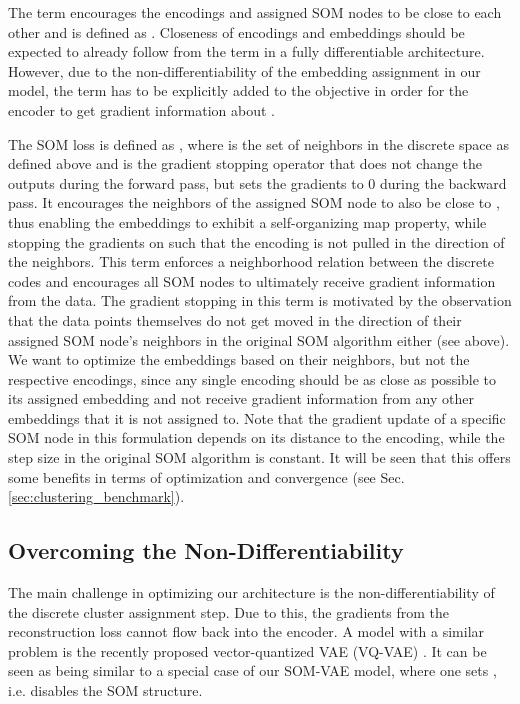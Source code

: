 \documentclass{article}
\begin{document}
The term  encourages the encodings and assigned SOM nodes to be close to each other and is defined as .
Closeness of encodings and embeddings should be expected to already follow from the  term in a fully differentiable architecture.
However, due to the non-differentiability of the embedding assignment in our model, the  term has to be explicitly added to the objective in order for the encoder to get gradient information about .

The SOM loss  is defined as , where  is the set of neighbors in the discrete space as defined above and  is the gradient stopping operator that does not change the outputs during the forward pass, but sets the gradients to 0 during the backward pass.
It encourages the neighbors of the assigned SOM node  to also be close to , thus enabling the embeddings to exhibit a self-organizing map property, while stopping the gradients on  such that the encoding is not pulled in the direction of the neighbors.
This term enforces a neighborhood relation between the discrete codes and encourages all SOM nodes to ultimately receive gradient information from the data.
The gradient stopping in this term is motivated by the observation that the data points themselves do not get moved in the direction of their assigned SOM node's neighbors in the original SOM algorithm either (see above).
We want to optimize the embeddings based on their neighbors, but not the respective encodings, since any single encoding should be as close as possible to its assigned embedding and not receive gradient information from any other embeddings that it is not assigned to.
Note that the gradient update of a specific SOM node in this formulation depends on its distance to the encoding, while the step size in the original SOM algorithm is constant.
It will be seen that this offers some benefits in terms of optimization and convergence (see Sec. \ref{sec:clustering_benchmark}).


\subsection{Overcoming the Non-Differentiability}\label{sec:non-differentiability}

The main challenge in optimizing our architecture is the non-differentiability of the discrete cluster assignment step.
Due to this, the gradients from the reconstruction loss cannot flow back into the encoder.
A model with a similar problem is the recently proposed vector-quantized VAE (VQ-VAE) \citep{Oord2017}.
It can be seen as being similar to a special case of our SOM-VAE model, where one sets , i.e. disables the SOM structure.
\end{document}
